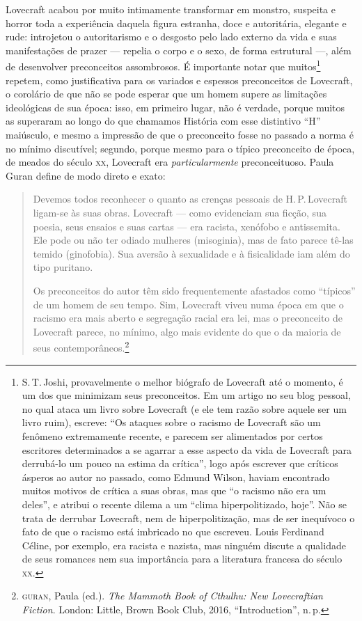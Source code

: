 Lovecraft acabou por muito intimamente transformar em monstro, suspeita
e horror toda a experiência daquela figura estranha, doce e autoritária,
elegante e rude: introjetou o autoritarismo e o desgosto pelo lado
externo da vida e suas manifestações de prazer --- repelia o
corpo e o sexo, de forma estrutural ---, além de
desenvolver preconceitos assombrosos. É importante notar que
muitos\footnote{S.\,T.\,Joshi, provavelmente o melhor biógrafo de
  Lovecraft até o momento, é um dos que minimizam seus preconceitos. Em
  um artigo no seu blog pessoal, no qual ataca um livro sobre Lovecraft
  (e ele tem razão sobre aquele ser um livro ruim), escreve: ``Os ataques
  sobre o racismo de Lovecraft são um fenômeno extremamente recente, e
  parecem ser alimentados por certos escritores determinados a se
  agarrar a esse aspecto da vida de Lovecraft para derrubá-lo um pouco
  na estima da crítica'', logo após escrever que críticos ásperos ao
  autor no passado, como Edmund Wilson, haviam encontrado muitos motivos
  de crítica a suas obras, mas que ``o racismo não era um deles'', e
  atribui o recente dilema a um ``clima hiperpolitizado, hoje''. Não se
  trata de derrubar Lovecraft, nem de hiperpolitização, mas de ser
  inequívoco o fato de que o racismo está imbricado no que escreveu.
  Louis Ferdinand Céline, por exemplo, era racista e nazista, mas
  ninguém discute a qualidade de seus romances nem sua importância para
  a literatura francesa do século \textsc{xx}.} repetem, como justificativa para
os variados e espessos preconceitos de Lovecraft, o corolário de que não
se pode esperar que um homem supere as limitações ideológicas de sua
época: isso, em primeiro lugar, não é verdade, porque muitos as
superaram ao longo do que chamamos História com esse distintivo ``H''
maiúsculo, e mesmo a impressão de que o preconceito fosse no passado a
norma é no mínimo discutível; segundo, porque mesmo para o típico
preconceito de época, de meados do século \textsc{xx}, Lovecraft era
\emph{particularmente} preconceituoso. Paula Guran define de modo direto
e exato:

\begin{quote}
Devemos todos reconhecer o quanto as crenças pessoais de H.\,P.\,Lovecraft
ligam-se às suas obras. Lovecraft --- como evidenciam sua ficção,
sua poesia, seus ensaios e suas cartas --- era racista, xenófobo e
antissemita. Ele pode ou não ter odiado mulheres (misoginia), mas de
fato parece tê-las temido (ginofobia). Sua aversão à sexualidade e à
fisicalidade iam além do tipo puritano.

Os preconceitos do autor têm sido frequentemente afastados como
``típicos'' de um homem de seu tempo. Sim, Lovecraft viveu numa época em
que o racismo era mais aberto e segregação racial era lei, mas o
preconceito de Lovecraft parece, no mínimo, algo mais evidente do que o
da maioria de seus contemporâneos.\footnote{\textsc{guran}, Paula (ed.).
  \emph{The Mammoth Book of Cthulhu: New Lovecraftian Fiction}. London:
  Little, Brown Book Club, 2016, ``Introduction'', n.\,p.}
\end{quote}

